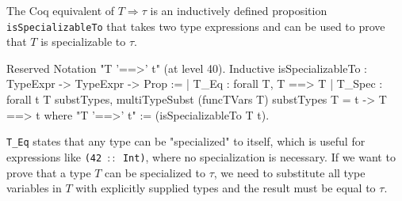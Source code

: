 \documentclass[paper = a4, fleqn, twoside]{scrreprt}
\newcommand{\coqinline}[1]{\texttt{#1}}
\begin{document}
\par
The Coq equivalent of $T \Rightarrow \tau$ is an inductively defined proposition \coqinline{isSpecializableTo} that takes two type expressions and can be used to prove that $T$ is specializable to $\tau$.
\begin{coqcode}
Reserved Notation "T '==>' t" (at level 40).
Inductive isSpecializableTo : TypeExpr -> TypeExpr -> Prop :=
  | T_Eq   : forall T, T  ==> T
  | T_Spec : forall t T substTypes,
               multiTypeSubst (funcTVars T) substTypes T = t ->
               T ==> t
where "T '==>' t" := (isSpecializableTo T t).
\end{coqcode}
\coqinline{T_Eq} states that any type can be "specialized" to itself, which is useful for expressions like \texttt{(42 $::$ Int)}, where no specialization is necessary. If we want to prove that a type $T$ can be specialized to $\tau$, we need to substitute all type variables in $T$ with explicitly supplied types and the result must be equal to $\tau$.
\end{document}
